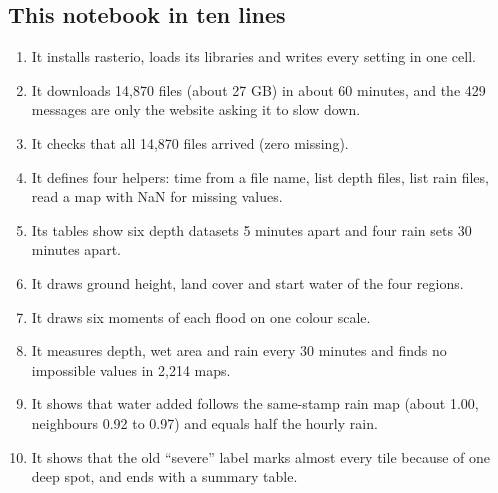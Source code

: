 \subsection{This notebook in ten lines}
\begin{enumerate}
\item It installs rasterio, loads its libraries and writes every setting in one cell.
\item It downloads 14,870 files (about 27 GB) in about 60 minutes, and the 429 messages are only the website asking it to slow down.
\item It checks that all 14,870 files arrived (zero missing).
\item It defines four helpers: time from a file name, list depth files, list rain files, read a map with NaN for missing values.
\item Its tables show six depth datasets 5 minutes apart and four rain sets 30 minutes apart.
\item It draws ground height, land cover and start water of the four regions.
\item It draws six moments of each flood on one colour scale.
\item It measures depth, wet area and rain every 30 minutes and finds no impossible values in 2,214 maps.
\item It shows that water added follows the same-stamp rain map (about 1.00, neighbours 0.92 to 0.97) and equals half the hourly rain.
\item It shows that the old ``severe'' label marks almost every tile because of one deep spot, and ends with a summary table.
\end{enumerate}
\endgroup
